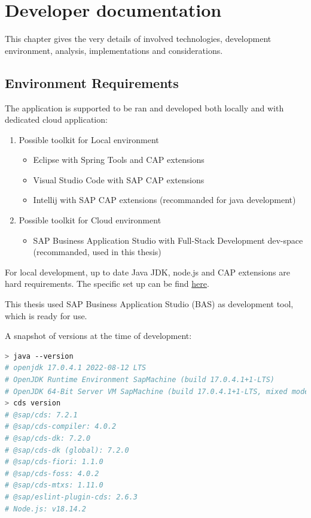 \chapter{Developer documentation}
\label{ch:impl}

This chapter gives the very details of involved technologies, development environment, analysis, implementations and considerations.

\section{Environment Requirements}
The application is supported to be ran and developed both locally and with dedicated cloud application: 
\begin{enumerate}
    \item Possible toolkit for Local environment
        \begin{itemize}
            \item Eclipse with Spring Tools and CAP extensions
            \item Visual Studio Code with SAP CAP extensions
            \item Intellij with SAP CAP extensions (recommanded for java development)
        \end{itemize}
    \item Possible toolkit for Cloud environment
        \begin{itemize}
            \item SAP Business Application Studio with Full-Stack Development dev-space (recommanded, used in this thesis)
        \end{itemize}
\end{enumerate}

For local development, up to date Java JDK, node.js and CAP extensions are hard requirements. The specific set up can be find \hyperlink{https://developers.sap.com/tutorials/btp-app-prepare-dev-environment-cap.html}{here}.

This thesis used SAP Business Application Studio (BAS) as development tool, which is ready for use. 

A snapshot of versions at the time of development:

\begin{lstlisting}[language={bash}]
> java --version
# openjdk 17.0.4.1 2022-08-12 LTS
# OpenJDK Runtime Environment SapMachine (build 17.0.4.1+1-LTS)
# OpenJDK 64-Bit Server VM SapMachine (build 17.0.4.1+1-LTS, mixed mode, sharing)
> cds version
# @sap/cds: 7.2.1
# @sap/cds-compiler: 4.0.2
# @sap/cds-dk: 7.2.0
# @sap/cds-dk (global): 7.2.0
# @sap/cds-fiori: 1.1.0
# @sap/cds-foss: 4.0.2
# @sap/cds-mtxs: 1.11.0
# @sap/eslint-plugin-cds: 2.6.3
# Node.js: v18.14.2

\end{lstlisting}


